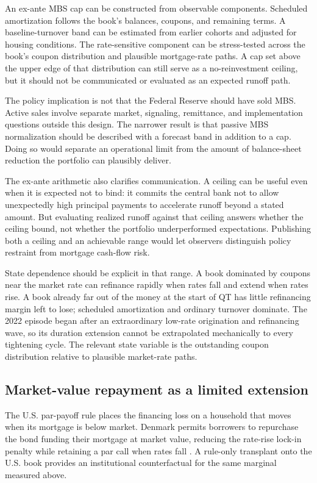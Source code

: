 An ex-ante MBS cap can be constructed from observable components. Scheduled amortization follows the book's balances, coupons, and remaining terms. A baseline-turnover band can be estimated from earlier cohorts and adjusted for housing conditions. The rate-sensitive component can be stress-tested across the book's coupon distribution and plausible mortgage-rate paths. A cap set above the upper edge of that distribution can still serve as a no-reinvestment ceiling, but it should not be communicated or evaluated as an expected runoff path.

The policy implication is not that the Federal Reserve should have sold MBS. Active sales involve separate market, signaling, remittance, and implementation questions outside this design. The narrower result is that passive MBS normalization should be described with a forecast band in addition to a cap. Doing so would separate an operational limit from the amount of balance-sheet reduction the portfolio can plausibly deliver.

The ex-ante arithmetic also clarifies communication. A ceiling can be useful even when it is expected not to bind: it commits the central bank not to allow unexpectedly high principal payments to accelerate runoff beyond a stated amount. But evaluating realized runoff against that ceiling answers whether the ceiling bound, not whether the portfolio underperformed expectations. Publishing both a ceiling and an achievable range would let observers distinguish policy restraint from mortgage cash-flow risk.

State dependence should be explicit in that range. A book dominated by coupons near the market rate can refinance rapidly when rates fall and extend when rates rise. A book already far out of the money at the start of QT has little refinancing margin left to lose; scheduled amortization and ordinary turnover dominate. The 2022 episode began after an extraordinary low-rate origination and refinancing wave, so its duration extension cannot be extrapolated mechanically to every tightening cycle. The relevant state variable is the outstanding coupon distribution relative to plausible market-rate paths.

\subsection{Market-value repayment as a limited extension}

The U.S. par-payoff rule places the financing loss on a household that moves when its mortgage is below market. Denmark permits borrowers to repurchase the bond funding their mortgage at market value, reducing the rate-rise lock-in penalty while retaining a par call when rates fall \citep{campbell2013,berg2018,andersen2020}. A rule-only transplant onto the U.S. book provides an institutional counterfactual for the same marginal measured above.

